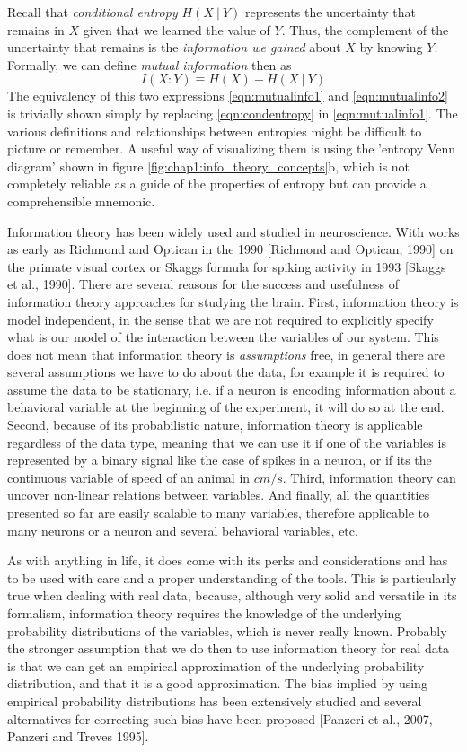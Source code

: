 Recall that \textit{conditional entropy} $H(X\ |\ Y)$ represents the uncertainty that remains in $X$ given that we learned the value of $Y$.
Thus, the complement of the uncertainty that remains is the \textit{information we gained} about $X$ by knowing $Y$. Formally, we can define \textit{mutual information} then as 
\begin{equation}
\label{eqn:mutualinfo2}
    I(X:Y)\equiv H(X) - H(X\ |\ Y)
\end{equation}
The equivalency of this two expressions \ref{eqn:mutualinfo1} and \ref{eqn:mutualinfo2}
is trivially shown simply by replacing \ref{eqn:condentropy} in \ref{eqn:mutualinfo1}.
The various definitions and relationships between entropies might be difficult to picture or remember. 
A useful way of visualizing them is using the 'entropy Venn diagram' shown in figure \ref{fig:chap1:info_theory_concepts}b, which is not completely reliable as a guide of the properties of entropy but can provide a comprehensible mnemonic. 

Information theory has been widely used and studied in neuroscience.
With works as early as Richmond and Optican in the 1990 [Richmond and Optican, 1990] on the primate visual cortex or Skaggs formula for spiking activity in 1993 [Skaggs et al., 1990].
There are several reasons for the success and usefulness of information theory approaches for studying the brain.
First, information theory is model independent, in the sense that we are not required to explicitly specify what is our model of the interaction between the variables of our system.
This does not mean that information theory is \textit{assumptions} free, in general there are several assumptions we have to do about the data, for example it is required to assume the data to be stationary, i.e. if a neuron is encoding information about a behavioral variable at the beginning of the experiment, it will do so at the end.     
Second, because of its probabilistic nature, information theory is applicable regardless of the data type, meaning that we can use it if one of the variables is represented by a binary signal like the case of spikes in a neuron, or if its the continuous variable of speed of an animal in $cm/s$.
Third, information theory can uncover non-linear relations between variables.
And finally, all the quantities presented so far are easily scalable to many variables, therefore applicable to many neurons or a neuron and several behavioral variables, etc.

As with anything in life, it does come with its perks and considerations and has to be used with care and a proper understanding of the tools.
This is particularly true when dealing with real data, because, although very solid and versatile in its formalism, information theory requires the knowledge of the underlying probability distributions of the variables, which is never really known. 
Probably the stronger assumption that we do then to use information theory for real data is that we can get an empirical approximation of the underlying probability distribution, and that it is a good approximation. 
The bias implied by using empirical probability distributions has been extensively studied and several alternatives for correcting such bias have been proposed [Panzeri et al., 2007, Panzeri and Treves 1995].

